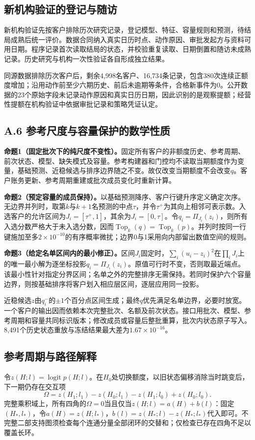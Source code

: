 \documentclass[a4paper,10pt]{article}
\begin{document}
\subsection*{新机构验证的登记与随访}
新机构验证先按客户排除历次研究记录，登记模型、特征、容量规则和预测，待结局成熟后统一评价。数据合同纳入真实日历时点、动作原因、审批发起方与资料可用日期。程序记录首次读取结局的状态，并校验重复读取、日期倒置和随访未成熟记录。历史研究与机构一次性验证各自形成独立结果。

同源数据排除历次客户后，剩余4,998名客户、16,734条记录，包含380次连续正额度增加；沿用动作前至少六期历史、前后未逾期等条件，合格新事件为0。公开数据的23个原始字段未记录动作原因和真实日历日期，因此识别的是观察提额；经营性提额在机构验证中依据审批记录和策略凭证认定。

\clearpage\subsection*{A.6 参考尺度与容量保护的数学性质}
\textbf{命题1（固定批次下的纯尺度不变性）。}固定所有客户的非额度历史、参考周期、前次状态、模型、缺失模式及容量。参考构建器和门控均不读取当期额度作为变量，基础预测、近稳候选与排序边界随之不变。故仅改变当期额度不会改变$q$。客户账务更新、参考周期重建或批次成员变化时重新计算。

\textbf{命题2（预定容量的成员保持）。}以基础预测降序、客户行键升序定义确定次序。无边界并列时，取第$k$与$k+1$名预测的中点$\tau$，并令$\tau^+$为其向上相邻可表示数。入选客户的允许区间为$J_i=[\tau^+,1]$，其余为$J_i=[0,\tau]$。令$q_i=\Pi_{J_i}(z_i)$，则所有入选分数严格大于未入选分数，因而$\operatorname{Top}_k(q)=\operatorname{Top}_k(p)$。并列时按同一行键施加至多$2\times10^{-10}$的有序概率微扰；边界0与1采用向内部留出数值空间的规则。

\textbf{命题3（给定名单区间内的最小修正）。}区间$J_i$固定时，$\sum_i(u_i-z_i)^2$在$\prod_iJ_i$上的唯一最小解为逐坐标投影$q_i=\Pi_{J_i}(z_i)$。原值可行时不变，否则取最近端点。该最小性针对指定分界区间；名单之外的完整排序无需保持。若同时保护六个容量边界，则按基础排序将客户划入相应层区间，逐层应用同一投影。

近稳候选$z$由$q_i^-$的$\pm1$个百分点区间生成；最终$q$优先满足名单边界，必要时放宽。一个客户的输出因而依赖本次完整批次、名额及前次状态。接口用批次、模型、参考周期和容量共同标识版本；修改成员或容量后整批重算，批次内状态原子写入。8,491个历史状态重放与冻结结果最大差为$1.67\times10^{-16}$。

\subsection*{参考周期与路径解释}
令$z(H;l)=\operatorname{logit}p(H;l)$。在$H_0$处切换额度，以旧状态偏移消除当时跳变后，下一期仍存在交互项
\[
\Omega=z(H_1;l_1)-z(H_0;l_1)-z(H_1;l_0)+z(H_0;l_0).
\]
完整乘积域上，所有四角的$\Omega=0$当且仅当$z(H;l)=a(H)+b(l)$：固定$(H_*,l_*)$，令$a(H)=z(H;l_*)$，$b(l)=z(H_*;l)-z(H_*;l_*)$代入即可。不完整二部支持图须检查每个连通分量全部闭环的交替和；仅检查已存在四角不足以覆盖长环。
\end{document}
